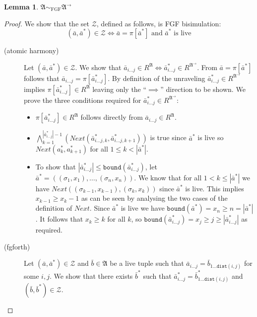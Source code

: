 \documentclass[draft]{scrartcl}
\theoremstyle{definition}
\newtheorem{lemma}[theorem]{Lemma}
\newcommand{\struct}[1]{\mathfrak{#1}}
\newcommand{\dist}[2]{\mathtt{dist}({#1},{#2})}
\newcommand{\nextrel}[2]{\mathit{Next}({#1},{#2})}
\newcommand{\sij}{_{i\ldots{}j}}
\begin{document}
\begin{lemma}
  $\struct{A} \sim_{\mathrm{FGF}} \struct{A}^{\rightarrow{}}$
\end{lemma}
\begin{proof}
  We show that the set $\mathcal{Z}$, defined as follows, is FGF bisimulation:
  \begin{equation*}
    (\bar{a}, \bar{a}^{*}) \in \mathcal{Z} \iff
    \bar{a} = \pi[\bar{a}^{*}] \text{\ and\ }
    \bar{a}^{*} \text{\ is live}
  \end{equation*}

  \begin{description}
    \item[(atomic harmony)]
          Let $(\bar{a}, \bar{a}^{*}) \in \mathcal{Z}$.
          We show that $\bar{a}_{i\ldots{}j} \in R^{\struct{A}} \iff \bar{a}^{*}_{i\ldots{}j} \in R^{\struct{A}^{\rightarrow}}$.
          From $\bar{a} = \pi[\bar{a}^{*}]$ follows that $\bar{a}_{i\ldots{}j} = \pi[\bar{a}^{*}_{i\ldots{}j}]$.
          By definition of the unraveling $\bar{a}^{*}_{i\ldots{}j} \in R^{\struct{A}^{\rightarrow}}$ implies $\pi[\bar{a}^{*}_{i\ldots{}j}] \in R^{\struct{A}}$ leaving only the ``$\implies$'' direction to be shown.
          We prove the three conditions required for $\bar{a}^{*}_{i\ldots{}j} \in R^{\struct{A}^{\rightarrow}}$:
          \begin{itemize}
            \item
                  $\pi[\bar{a}^{*}_{i\ldots{}j}] \in R^{\mathfrak{A}}$ follows directly from $\bar{a}_{i\ldots{}j} \in R^{\mathfrak{A}}$.
            \item
                  $\bigwedge_{k=1}^{|\bar{a}^{*}_{i\ldots{}j}|-1}{(\nextrel{\bar{a}^{*}_{i\ldots{}j,k}}{{}\bar{a}^{*}_{i\ldots{}j,k+1}})}$ is true since $\bar{a}^{*}$ is live so $\nextrel{a^{*}_{k}}{a^{*}_{k+1}}$ for all $1 \le k < |\bar{a}^{*}|$.
            \item
                  To show that $|\bar{a}^{*}_{i\ldots{j}}| \le \mathtt{bound}(\bar{a}^{*}_{i\ldots{}j})$, let $\bar{a}^{*} = ((\sigma_{1}, x_{1}), \ldots{}, (\sigma_{n}, x_{n}))$.
                  We know that for all $1 < k \le |\bar{a}^{*}|$ we have $\nextrel{(\sigma_{k-1}, x_{k-1})}{(\sigma_{k}, x_{k})}$ since $\bar{a}^{*}$ is live.
                  This implies $x_{k-1} \ge x_{k} - 1$ as can be seen by analysing the two cases of the definition of $\mathit{Next}$.
                  Since $\bar{a}^{*}$ is live we have $\mathtt{bound}(\bar{a}^{*}) = x_{n} \ge n = |\bar{a}^{*}|$.
                  It follows that $x_{k} \ge k$ for all $k$, so $\mathtt{bound}(\bar{a}^{*}_{i\ldots{}j}) = x_{j} \ge j \ge |\bar{a}^{*}_{i\ldots{j}}|$ as required.
          \end{itemize}
    \item[(fgforth)]
          Let $(\bar{a}, \bar{a}^{*}) \in \mathcal{Z}$ and $\bar{b} \in \mathfrak{A}$ be a live tuple such that $\bar{a}\sij = \bar{b}_{1\ldots{}\dist{i}{j}}$ for some $i,j$.
          We show that there exists $\bar{b}^{*}$ such that $\bar{a}^{*}\sij = \bar{b}^{*}_{1\ldots{}\dist{i}{j}}$ and $(\bar{b}, \bar{b}^{*}) \in \mathcal{Z}$.


\end{description}
\end{proof}
\end{document}
